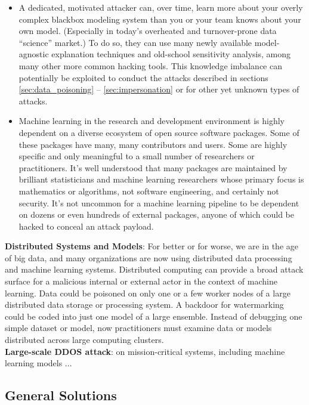 \documentclass[fleqn]{article}
\begin{document}
\begin{itemize}

\item A dedicated, motivated attacker can, over time, learn more about your overly complex blackbox modeling system than you or your team knows about your own model. (Especially in today's overheated and turnover-prone data ``science'' market.) To do so, they can use many newly available model-agnostic explanation techniques and old-school sensitivity analysis, among many other more common hacking tools. This knowledge imbalance can potentially be exploited to conduct the attacks described in sections \ref{sec:data_poisoning} -- \ref{sec:impersonation} or for other yet unknown types of attacks. 

\item Machine learning in the research and development environment is highly dependent on a diverse ecosystem of open source software packages. Some of these packages have many, many contributors and users. Some are highly specific and only meaningful to a small number of researchers or practitioners. It's well understood that many packages are maintained by brilliant statisticians and machine learning researchers whose primary focus is mathematics or algorithms, not software engineering, and certainly not security. It's not uncommon for a machine learning pipeline to be dependent on dozens or even hundreds of external packages, anyone of which could be hacked to conceal an attack payload.
 
\end{itemize}

\noindent\textbf{Distributed Systems and Models}: For better or for worse, we are in the age of big data, and many organizations are now using distributed data processing and machine learning systems. Distributed computing can provide a broad attack surface for a malicious internal or external actor in the context of machine learning. Data could be poisoned on only one or a few worker nodes of a large distributed data storage or processing system. A backdoor for watermarking could be coded into just one model of a large ensemble. Instead of debugging one simple dataset or model, now practitioners must examine data or models distributed across large computing clusters.\\

\noindent\textbf{Large-scale DDOS attack}: on mission-critical systems, including machine learning models ...


\subsection{General Solutions}
\end{document}
